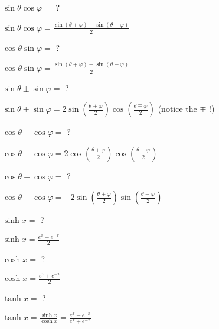 \documentclass[12pt]{article}
\newcommand*{\xfield}[1]{\begin{mdframed}\centering #1\end{mdframed}\bigskip}
\newenvironment{note}{}{}
\begin{document}
\begin{note}
    \xfield{$\sin \theta \cos \varphi =$ ?}
    \xfield{$\sin \theta \cos \varphi = \frac{\sin(\theta + \varphi) + \sin(\theta - \varphi)} {2}$}
\end{note}

\begin{note}
    \xfield{$\cos \theta \sin \varphi =$ ?}
    \xfield{$\cos \theta \sin \varphi = \frac{\sin(\theta + \varphi) - \sin(\theta - \varphi)} {2}$}
\end{note}

\begin{note}
    \xfield{$\sin \theta \pm \sin \varphi =$ ?}
    \xfield{$\sin \theta \pm \sin \varphi = 2 \sin\left( \frac{\theta \pm \varphi}{2} \right) \cos\left( \frac{\theta \mp \varphi}{2} \right)$ (notice the $\mp$ !)}
\end{note}

\begin{note}
    \xfield{$\cos \theta + \cos \varphi =$ ?}
    \xfield{$\cos \theta + \cos \varphi = 2 \cos\left( \frac{\theta + \varphi} {2} \right) \cos\left( \frac{\theta - \varphi}{2} \right)$}
\end{note}

\begin{note}
    \xfield{$\cos \theta - \cos \varphi =$ ?}
    \xfield{$\cos \theta - \cos \varphi = -2\sin\left( \frac{\theta + \varphi} {2}\right) \sin\left(\frac {\theta - \varphi}{2}\right)$}
\end{note}

\begin{note}
    \xfield{$\sinh x =$ ?}
    \xfield{$\sinh x = \frac {e^x - e^{-x}} {2}$}
\end{note}

\begin{note}
    \xfield{$\cosh x = $ ?}
    \xfield{$\cosh x = \frac {e^x + e^{-x}} {2}$}
\end{note}

\begin{note}
    \xfield{$\tanh x =$ ?}
    \xfield{$\tanh x = \frac{\sinh x}{\cosh x} = \frac {e^x - e^{-x}} {e^x + e^{-x}}$}
\end{note}
\end{document}

